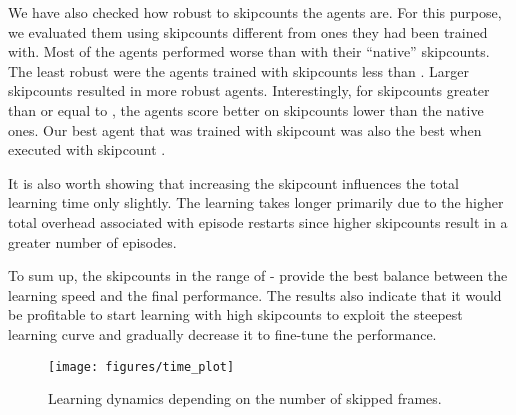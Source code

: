 \documentclass[english,american,conference, balance]{IEEEtran}
\begin{document}
We have also checked how robust to skipcounts the agents are. For
this purpose, we evaluated them using skipcounts different from ones
they had been trained with. Most of the agents performed worse than
with their ``native'' skipcounts. The least robust were the agents
trained with skipcounts less than . Larger skipcounts resulted
in more robust agents. Interestingly, for skipcounts greater than
or equal to , the agents score better on skipcounts lower than
the native ones. Our best agent that was trained with skipcount 
was also the best when executed with skipcount . 

It is also worth showing that increasing the skipcount influences
the total learning time only slightly. The learning takes longer primarily
due to the higher total overhead associated with episode restarts
since higher skipcounts result in a greater number of episodes.

To sum up, the skipcounts in the range of - provide the best
balance between the learning speed and the final performance. The
results also indicate that it would be profitable to start learning
with high skipcounts to exploit the steepest learning curve and gradually
decrease it to fine-tune the performance.

\begin{figure}
\begin{centering}
\texttt{[image: figures/time\_plot]} 
\par\end{centering}
\centering{}\caption{\label{fig:skiprate_time}Learning dynamics depending on the number
of skipped frames.}
\end{figure}
\end{document}
